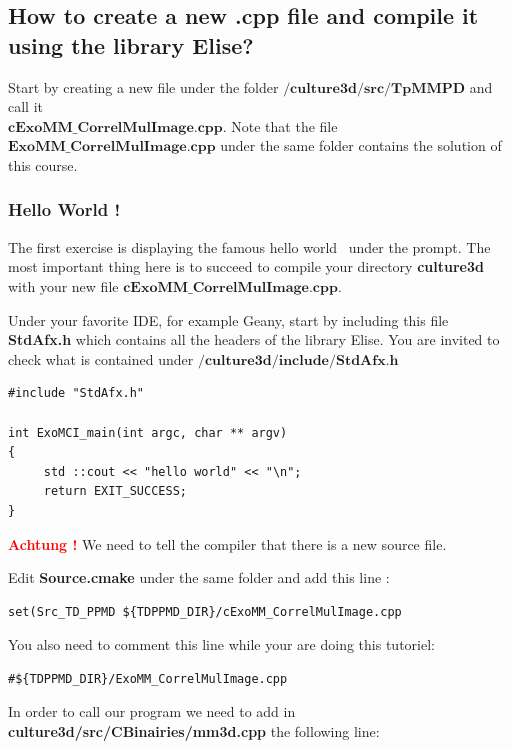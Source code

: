 \subsection{How to create a new .cpp file and compile it using the library Elise?}
Start by creating a new file under the folder $\textbf{/culture3d/src/TpMMPD}$ and call it \\$\textbf{cExoMM\_CorrelMulImage.cpp}$. Note that the file $\textbf{ExoMM\_CorrelMulImage.cpp}$ under the same folder contains the solution of this course.
\subsubsection{Hello World !}
The first exercise is displaying the famous \og hello world \fg\ under the prompt. The most important thing here is to succeed to compile your directory \textbf{culture3d} with your new file  $\textbf{cExoMM\_CorrelMulImage.cpp}$.\newline


Under your favorite IDE, for example Geany, start by including this file \textbf{StdAfx.h} which contains all the headers of the library Elise. You are invited to check what is contained under $\textbf{/culture3d/include/StdAfx.h}$ \newline

\begin{lstlisting}
#include "StdAfx.h"

int ExoMCI_main(int argc, char ** argv)
{
     std ::cout << "hello world" << "\n";
     return EXIT_SUCCESS;
}
\end{lstlisting}

\textbf{\textcolor{red}{Achtung !}} We need to tell the compiler that there is a new source file.

Edit \textbf{Source.cmake} under the same folder and add this line : \newline

\begin{verbatim}
set(Src_TD_PPMD ${TDPPMD_DIR}/cExoMM_CorrelMulImage.cpp
\end{verbatim}

You also need to comment this line while your are doing this tutoriel:
\begin{verbatim}
#${TDPPMD_DIR}/ExoMM_CorrelMulImage.cpp
\end{verbatim}

In order to call our program we need to add in \textbf{culture3d/src/CBinairies/mm3d.cpp} the following line: \newline


